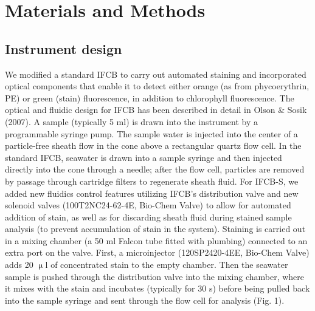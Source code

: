 \section{Materials and Methods}

\subsection{Instrument design}\label{ch2:opts}

We modified a standard IFCB to carry out automated staining and incorporated optical components that enable it to detect either orange (as from phycoerythrin, PE) or green (stain) fluorescence, in addition to chlorophyll fluorescence. The optical and fluidic design for IFCB has been described in detail in Olson \& Sosik (2007). A sample (typically 5 ml) is drawn into the instrument by a programmable syringe pump. The sample water is injected into the center of a particle-free sheath flow in the cone above a rectangular quartz flow cell. In the standard IFCB, seawater is drawn into a sample syringe and then injected directly into the cone through a needle; after the flow cell, particles are removed by passage through cartridge filters to regenerate sheath fluid. For IFCB-S, we added new fluidics control features utilizing IFCB's distribution valve and new solenoid valves (100T2NC24-62-4E, Bio-Chem Valve) to allow for automated addition of stain, as well as for discarding sheath fluid during stained sample analysis (to prevent accumulation of
stain in the system). Staining is carried out in a mixing chamber (a 50 ml Falcon tube fitted with plumbing) connected to an extra port on the valve. First, a microinjector (120SP2420-4EE, Bio-Chem Valve) adds 20 $\upmu$l of concentrated stain to the empty chamber. Then the seawater sample is pushed through the distribution valve into the mixing chamber, where it mixes with the stain and incubates (typically for 30 s) before being pulled back into the sample syringe and sent through the flow cell for analysis (Fig. 1). 


